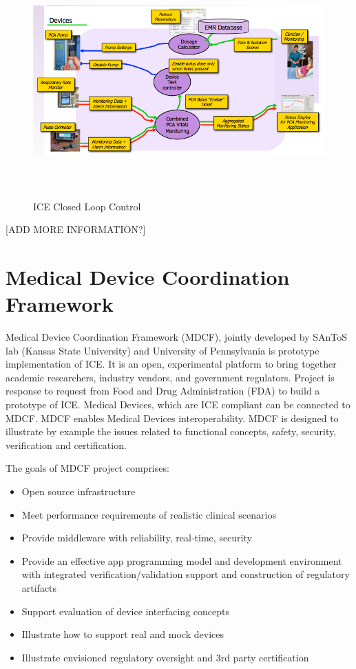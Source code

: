 \begin{figure}[ht]%
    \begin{center}
    	\includegraphics[height=3.5in]{figures/ice.png}
    	\caption{ICE Closed Loop Control}    	
    \end{center}
    \label{figure:ice}
\end{figure}

[ADD MORE INFORMATION?]


\section{Medical Device Coordination Framework}
\label{background:mdcf}

Medical Device Coordination Framework (MDCF), jointly developed by SAnToS lab (Kansas State University) and University of Pennsylvania is prototype implementation of ICE. It is an open, experimental platform to bring together academic researchers, industry vendors, and government regulators. Project is response to request from Food and Drug Administration (FDA) to build a prototype of ICE. Medical Devices, which are ICE compliant can be connected to MDCF. MDCF enables Medical Devices interoperability. MDCF is designed to illustrate by example the issues related to functional concepts, safety, security, verification and certification. 

The goals of MDCF project comprises:
\begin{itemize}
	\item Open source infrastructure
	\item Meet performance requirements of realistic clinical scenarios
	\item Provide middleware with reliability, real-time, security
	\item Provide an effective app programming model and development environment with integrated verification/validation support and construction of regulatory artifacts
	\item Support evaluation of device interfacing concepts
	\item Illustrate how to support real and mock devices
	\item Illustrate envisioned regulatory oversight and 3rd party certification
\end{itemize}

